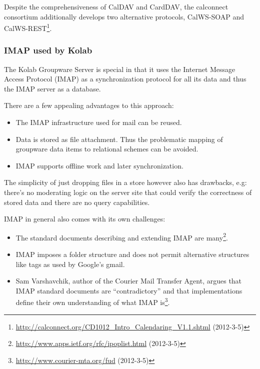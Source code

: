 \documentclass[12pt,a4paper]{scrartcl}		%
\newcommand{\citeurl}[2]{\url{#1} (#2)}
\begin{document}
Despite the comprehensiveness of CalDAV and CardDAV, the calconnect consortium
additionally develops two alternative protocols, CalWS-SOAP and
CalWS-REST\footnote{\citeurl{http://calconnect.org/CD1012_Intro_Calendaring_V1.1.shtml}{2012-3-5}}.

\subsubsection{IMAP used by Kolab}

The Kolab Groupware Server is special in that it uses the Internet Message
Access Protocol (IMAP) as a synchronization protocol for all its data and thus
the IMAP server as a database.

There are a few appealing advantages to this approach:

\begin{itemize}
  \item The IMAP infrastructure used for mail can be reused.
  \item Data is stored as file attachment. Thus the problematic mapping of
  groupware data items to relational schemes can be avoided.
  \item IMAP supports offline work and later synchronization.
\end{itemize}

The simplicity of just dropping files in a store however also has drawbacks,
e.g: there's no moderating logic on the server site that could verify the
correctness of stored data and there are no query capabilities.

IMAP in general also comes with its own challenges:

\begin{itemize}
\item The standard documents describing and extending IMAP are
  many\footnote{\citeurl{http://www.apps.ietf.org/rfc/ipoplist.html}{2012-3-5}}.
\item IMAP imposes a folder structure and does not permit alternative structures
  like tags as used by Google's gmail.
\item Sam Varshavchik, author of the Courier Mail Transfer Agent, argues that
  IMAP standard documents are ``contradictory'' and that implementations define
  their own understanding of what IMAP
  is\footnote{\citeurl{http://www.courier-mta.org/fud}{2012-3-5}}.
\end{itemize}
\end{document}
